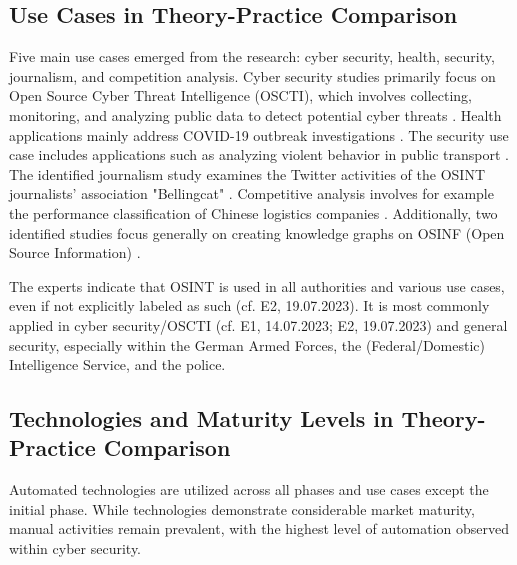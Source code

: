 \documentclass[10pt]{article}
\begin{document}
\subsection{Use Cases in Theory-Practice Comparison}

Five main use cases emerged from the research: cyber security, health, security, journalism,
and competition analysis. Cyber security studies primarily focus on Open Source Cyber Threat
Intelligence (OSCTI), which involves collecting, monitoring, and analyzing public
data to detect potential cyber threats \cite{Ahuja.2022,AlDmour.2023}.
Health applications mainly address COVID-19 outbreak investigations \cite{Kpozehouen.2020}.
The security use case includes applications such as
analyzing violent behavior in public transport \cite{Nobili.2021}. The identified journalism study examines the
Twitter activities of the OSINT journalists' association "Bellingcat" \cite{Bar.2023}. Competitive analysis
involves for example the performance classification of Chinese logistics companies \cite{Tao.2023}.
Additionally, two identified studies focus generally on creating knowledge graphs on OSINF (Open Source Information) \cite{Hu.2023, Ma.2022}.

The experts indicate that OSINT is used in all authorities and various use cases, even if not explicitly labeled as such (cf. E2, 19.07.2023). It is most commonly applied in cyber security/OSCTI (cf. E1, 14.07.2023; E2, 19.07.2023) and general security, especially within the German Armed Forces, the (Federal/Domestic) Intelligence Service, and the police.

\subsection{Technologies and Maturity Levels in Theory-Practice Comparison}

Automated technologies are utilized across all phases and use cases except the initial phase.
While technologies demonstrate considerable market maturity, manual activities remain prevalent, with the highest level of automation observed within cyber security.
\end{document}
